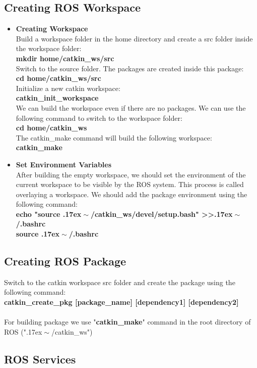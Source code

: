 \documentclass[•]{article}
\newcommand{\mytilde}{\raise.17ex\hbox{$\scriptstyle\mathtt{‌​\sim}$}}
\begin{document}
\subsection{Creating ROS Workspace}
\begin{itemize}
\item \textbf{Creating Workspace}\\
Build a workspace folder in the home directory and create a src folder inside the workspace folder:\\
\textbf{mkdir home/catkin_ws/src}\\
Switch to the source folder. The packages are created inside this package:\\
\textbf{cd home/catkin_ws/src}\\
Initialize a new catkin workspace:\\
\textbf{catkin_init_workspace}\\
We can build the workspace even if there are no packages. We can use the following command to switch to the workspace folder:\\
\textbf{cd home/catkin_ws}\\
The catkin_make command will build the following workspace:\\
\textbf{catkin_make}\\
\item \textbf{Set Environment Variables}\\
After building the empty workspace, we should set the environment of the current workspace to be visible by the ROS system. This process is called overlaying a workspace. We should add the package environment using the following command:\\
\textbf{echo "source \mytilde/catkin_ws/devel/setup.bash" \textgreater \textgreater \mytilde/.bashrc}\\
\textbf{source \mytilde/.bashrc}
\end{itemize}
\subsection{Creating ROS Package}
Switch to the catkin workspace src folder and create the package using the following command:\\
\textbf{catkin_create_pkg [package_name] [dependency1] [dependency2]}\\
\\For building package we use "\textbf{catkin_make}" command in the root directory of ROS ("\mytilde/catkin_ws")
\subsection{ROS Services}
\end{document}
